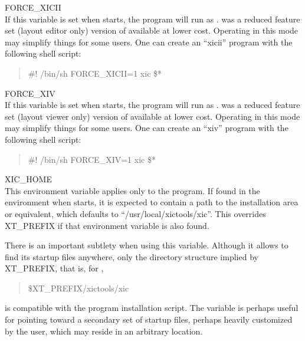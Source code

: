 \begin{description}
\item{\et FORCE\_XICII}\\
If this variable is set when {\Xic} starts, the program will run as
{\XicII}.  {\XicII} was a reduced feature set (layout editor only)
version of {\Xic} available at lower cost.  Operating in this mode may
simplify things for some users.  One can create an ``{\vt xicii}''
program with the following shell script:

\begin{quote}\vt
\#! /bin/sh\newline\newline
FORCE\_XICII=1 xic \$*
\end{quote}

\item{\et FORCE\_XIV}\\
If this variable is set when {\Xic} starts, the program will run as
{\Xiv}.  {\Xiv} was a reduced feature set (layout viewer only) version
of {\Xic} available at lower cost.  Operating in this mode may
simplify things for some users.  One can create an ``{\vt xiv}''
program with the following shell script:

\begin{quote}\vt
\#! /bin/sh\newline\newline
FORCE\_XIV=1 xic \$*
\end{quote}

\item{\et XIC\_HOME}\\
This environment variable applies only to the {\Xic} program.  If
found in the environment when {\Xic} starts, it is expected to contain
a path to the {\Xic} installation area or equivalent, which defaults
to ``{\vt /usr/local/xictools/xic}''.  This overrides {\et XT\_PREFIX}
if that environment variable is also found.
 
There is an important subtlety when using this variable.  Although it
allows {\Xic} to find its startup files anywhere, only the directory
structure implied by {\et XT\_PREFIX}, that is, for {\Xic},
\begin{quote} \vt
\$XT\_PREFIX/xictools/xic
\end{quote}
is compatible with the program installation script.  The variable is
perhaps useful for pointing {\Xic} toward a secondary set of startup
files, perhaps heavily customized by the user, which may reside in
an arbitrary location.


\end{description}

